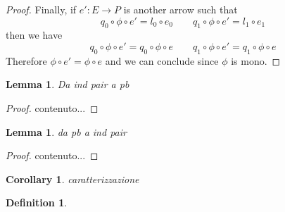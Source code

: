 \documentclass[a4paper,twoside]{report}
\def\Set{\textbf {\textup{Set}}}
\newtheorem{lemma}[theorem]{Lemma}
\newtheorem{corollary}[theorem]{Corollary}
\theoremstyle{definition}
\newtheorem{definition}[theorem]{Definition}
\begin{document}
\begin{proof}
Finally, if $e'\colon E \to P$ is another arrow such that 		
\[q_0\circ \phi\circ e'=l_0\circ e_0 \qquad q_1\circ \phi\circ e'=l_1\circ e_1\]
then we have 
\[q_0\circ \phi\circ e'=q_0\circ \phi\circ e \qquad q_1\circ \phi\circ e'=q_1\circ \phi\circ e\]
Therefore $\phi\circ e'=\phi \circ e$ and we can conclude since $\phi$ is mono.
	\end{proof}


\begin{lemma}
	Da ind pair a pb
\end{lemma}

\begin{proof}
	contenuto...
\end{proof}

\begin{lemma}
	da pb a ind pair
\end{lemma}
\begin{proof}
	contenuto...
\end{proof}

\begin{corollary}
	caratterizzazione
\end{corollary}
\fi 






\appendix










\iffalse 

\section{Rewriting systems on $\Set$.}\label{app:set}

\section{On permutations}\label{app:perm}
\todo{inserire risutati sulle permutazione che abbiamo usato}
\fi 

\begin{definition}
\end{definition}
\end{document}
